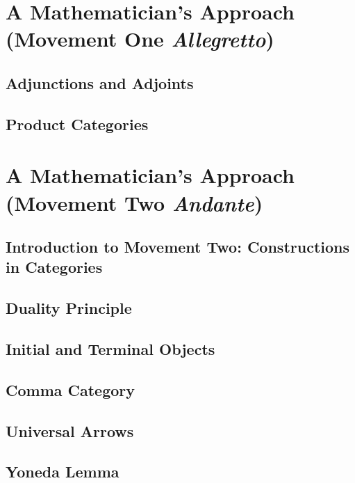 \documentclass{amsart}
\theoremstyle{plain}
\theoremstyle{definition}
\begin{document}
\chapter{A Mathematician's Approach (Movement One \emph{Allegretto})}
\section{Adjunctions and Adjoints}

\section{Product Categories}

%

\chapter{A Mathematician's Approach (Movement Two \emph{Andante})}
\section{Introduction to Movement Two: Constructions in Categories}

\section{Duality Principle}

\section{Initial and Terminal Objects}

\section{Comma Category}

\section{Universal Arrows}

\section{Yoneda Lemma}

\end{document}
